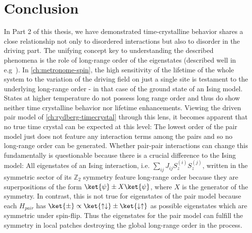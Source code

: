 \chapter{Conclusion}\label{ch:floquet-discussion}

In Part 2 of this thesis, we have demonstrated time-crystalline behavior shares a close relationship not only to disordered interactions but also to disorder in the driving part. The unifying concept key to understanding the described phenomena is the role of long-range order of the eigenstates (described well in e.g~\cite{vonkeyserlingkAbsoluteStabilitySpatiotemporal2016,elsePrethermalPhasesMatter2017}). In \autoref{ch:metronome-spin}, the high sensitivity of the lifetime of the whole system to the variation of the driving field on just a single site is testament to the underlying long-range order - in that case of the ground state of an Ising model. States at higher temperature do not possess long range order and thus do show neither time crystalline behavior nor lifetime enhancements. Viewing the driven pair model of \autoref{ch:rydberg-timecrystal} through this lens, it becomes apparent that no true time crystal can be expected at this level: The lowest order of the pair model just does not feature any interaction terms among the pairs and so no long-range order can be generated. Whether pair-pair interactions can change this fundamentally is questionable because there is a crucial difference to the Ising model: All eigenstates of an Ising interaction, i.e. $\sum_{ij} J_{ij}S_{z}^{(i)}S_{z}^{(j)}$, written in the symmetric sector of its $\mathbb{Z}_2$ symmetry feature long-range order because they are superpositions of the form $\ket{\psi}\pm X\ket{\psi}$, where $X$ is the generator of the symmetry. In contrast, this is not true for eigenstates of the pair model because each $H_{pair}$ has $\ket{\pm}\propto\ket{\uparrow\downarrow}\pm \ket{\downarrow\uparrow}$ as possible eigenstates which are symmetric under spin-flip. Thus the eigenstates for the pair model can fulfill the symmetry in local patches destroying the global long-range order in the process.


